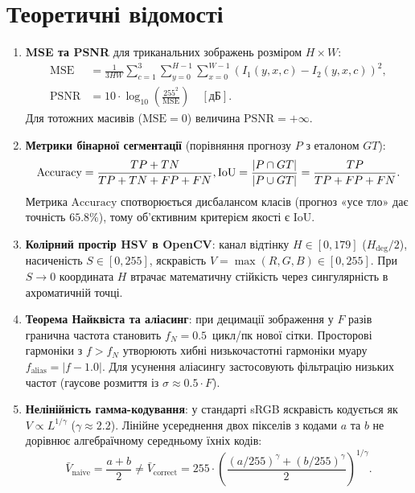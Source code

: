\documentclass[14pt, a4paper]{extarticle}
\begin{document}
\section{Теоретичні відомості}
\begin{enumerate}
    \item \textbf{MSE та PSNR} для триканальних зображень розміром $H \times W$:
    \begin{align}
        \text{MSE} &= \frac{1}{3 H W} \sum_{c=1}^3 \sum_{y=0}^{H-1} \sum_{x=0}^{W-1} \left(I_1(y, x, c) - I_2(y, x, c)\right)^2, \\
        \text{PSNR} &= 10 \cdot \log_{10} \left( \frac{255^2}{\text{MSE}} \right) \quad [\text{дБ}].
    \end{align}
    Для тотожних масивів ($\text{MSE} = 0$) величина $\text{PSNR} = +\infty$.

    \item \textbf{Метрики бінарної сегментації} (порівняння прогнозу $P$ з еталоном $GT$):
    \begin{equation}
        \text{Accuracy} = \frac{TP + TN}{TP + TN + FP + FN},
        \\
         \text{IoU} = \frac{|P \cap GT|}{|P \cup GT|} = \frac{TP}{TP + FP + FN}.
    \end{equation}
    Метрика $\text{Accuracy}$ спотворюється дисбалансом класів (прогноз «усе тло» дає точність $65.8\%$), тому об'єктивним критерієм якості є $\text{IoU}$.

    \item \textbf{Колірний простір HSV в OpenCV}: канал відтінку $H \in [0, 179]$ ($H_{\text{deg}} / 2$), насиченість $S \in [0, 255]$, яскравість $V = \max(R,G,B) \in [0, 255]$. При $S \to 0$ координата $H$ втрачає математичну стійкість через сингулярність в ахроматичній точці.

    \item \textbf{Теорема Найквіста та аліасинг}: при децимації зображення у $F$ разів гранична частота становить $f_N = 0.5$~цикл/пк нової сітки. Просторові гармоніки з $f > f_N$ утворюють хибні низькочастотні гармоніки муару $f_{\text{alias}} = |f - 1.0|$. Для усунення аліасингу застосовують фільтрацію низьких частот (гаусове розмиття із $\sigma \approx 0.5 \cdot F$).

    \item \textbf{Нелінійність гамма-кодування}: у стандарті sRGB яскравість кодується як $V \propto L^{1/\gamma}$ ($\gamma \approx 2.2$). Лінійне усереднення двох пікселів з кодами $a$ та $b$ не дорівнює алгебраїчному середньому їхніх кодів:
    \begin{equation}
        \bar{V}_{\text{naive}} = \frac{a + b}{2} \ne \bar{V}_{\text{correct}} = 255 \cdot \left( \frac{(a/255)^\gamma + (b/255)^\gamma}{2} \right)^{1/\gamma}.
    \end{equation}
\end{enumerate}
\end{document}
